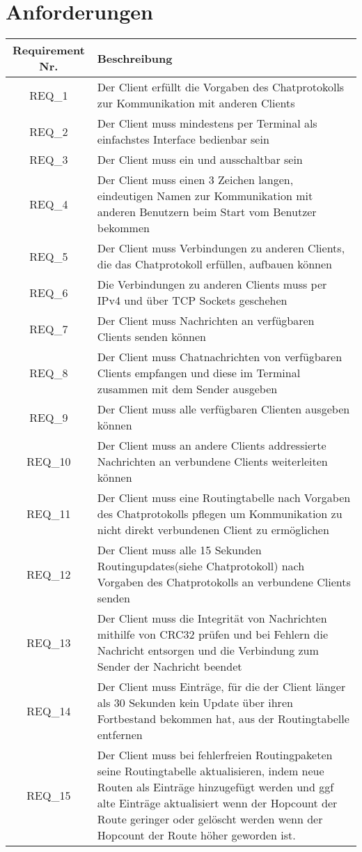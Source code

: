 \section{Anforderungen}

\begin{tabular}{|c|p{13.5cm}|}
\hline
Requirement Nr. & Beschreibung
\\ \hline

REQ\_1 & Der Client erfüllt die Vorgaben des Chatprotokolls zur Kommunikation mit anderen Clients\\
\hline
REQ\_2 & Der Client muss mindestens per Terminal als einfachstes Interface bedienbar sein \\
\hline
REQ\_3 & Der Client muss ein\- und ausschaltbar sein\\
\hline
REQ\_4 & Der Client muss einen 3 Zeichen langen, eindeutigen Namen zur Kommunikation mit anderen Benutzern beim Start vom Benutzer bekommen\\
\hline
REQ\_5 & Der Client muss Verbindungen zu anderen Clients, die das Chatprotokoll erfüllen, aufbauen können\\
\hline
REQ\_6 & Die Verbindungen zu anderen Clients muss per IPv4 und über TCP Sockets geschehen\\
\hline
REQ\_7 & Der Client muss Nachrichten an verfügbaren Clients senden können\\
\hline
REQ\_8 & Der Client muss Chatnachrichten von verfügbaren Clients empfangen und diese im Terminal zusammen mit dem Sender ausgeben\\
\hline
REQ\_9 & Der Client muss alle verfügbaren Clienten ausgeben können\\
\hline
REQ\_10 & Der Client muss an andere Clients addressierte Nachrichten an verbundene Clients weiterleiten können\\
\hline
REQ\_11 & Der Client muss eine Routingtabelle nach Vorgaben des Chatprotokolls pflegen um Kommunikation zu nicht direkt verbundenen Client zu ermöglichen\\
\hline
REQ\_12 & Der Client muss alle 15 Sekunden Routingupdates(siehe Chatprotokoll) nach Vorgaben des Chatprotokolls an verbundene Clients senden\\
\hline
REQ\_13 & Der Client muss die Integrität von Nachrichten mithilfe von CRC32 prüfen und bei Fehlern die Nachricht entsorgen und die Verbindung zum Sender der Nachricht beendet\\
\hline
REQ\_14 & Der Client muss Einträge, für die der Client länger als 30 Sekunden kein Update über ihren Fortbestand bekommen hat, aus der Routingtabelle entfernen\\
\hline
REQ\_15 & Der Client muss bei fehlerfreien Routingpaketen seine Routingtabelle aktualisieren, indem neue Routen als Einträge hinzugefügt werden und ggf alte Einträge aktualisiert wenn der Hopcount der Route geringer oder gelöscht werden wenn der Hopcount der Route höher geworden ist.\\
\hline
\end{tabular}